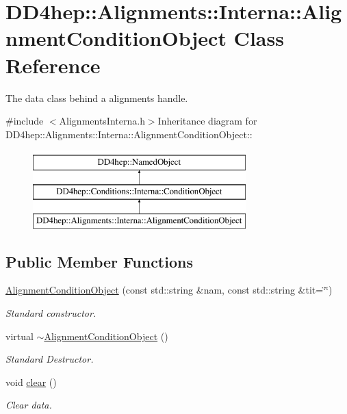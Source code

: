 \hypertarget{class_d_d4hep_1_1_alignments_1_1_interna_1_1_alignment_condition_object}{
\section{DD4hep::Alignments::Interna::AlignmentConditionObject Class Reference}
\label{class_d_d4hep_1_1_alignments_1_1_interna_1_1_alignment_condition_object}
}


The data class behind a alignments handle.  


{\ttfamily \#include $<$AlignmentsInterna.h$>$}Inheritance diagram for DD4hep::Alignments::Interna::AlignmentConditionObject::\begin{figure}[H]
\begin{center}
\leavevmode
\includegraphics[height=3cm]{class_d_d4hep_1_1_alignments_1_1_interna_1_1_alignment_condition_object}
\end{center}
\end{figure}
\subsection*{Public Member Functions}
\begin{DoxyCompactItemize}
\item 
\hyperlink{class_d_d4hep_1_1_alignments_1_1_interna_1_1_alignment_condition_object_a3156840cdc6751011cd6128bfd2c1c5a}{AlignmentConditionObject} (const std::string \&nam, const std::string \&tit=\char`\"{}\char`\"{})
\begin{DoxyCompactList}\small\item\em Standard constructor. \item\end{DoxyCompactList}\item 
virtual \hyperlink{class_d_d4hep_1_1_alignments_1_1_interna_1_1_alignment_condition_object_abbec903201eccc7d7ff725c6b573aaa7}{$\sim$AlignmentConditionObject} ()
\begin{DoxyCompactList}\small\item\em Standard Destructor. \item\end{DoxyCompactList}\item 
void \hyperlink{class_d_d4hep_1_1_alignments_1_1_interna_1_1_alignment_condition_object_a8290f82fe5e45264993a475a7f532518}{clear} ()
\begin{DoxyCompactList}\small\item\em Clear data. \item\end{DoxyCompactList}\end{DoxyCompactItemize}
